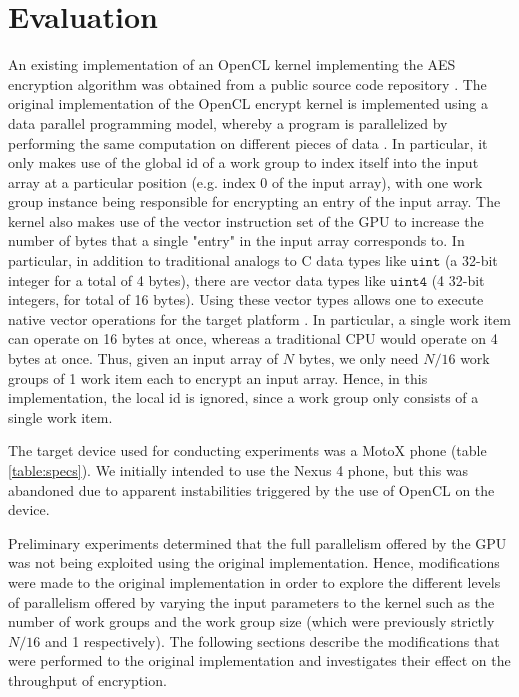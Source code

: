 \documentclass[conference,10pt]{IEEEtran}
\begin{document}

\section{Evaluation}

An existing implementation of an OpenCL kernel implementing the AES encryption algorithm was obtained from 
a public source code repository \cite{opencl_impl}.  The original implementation of the OpenCL encrypt 
kernel is implemented using a data parallel programming model, whereby a program is parallelized by 
performing the same computation on different pieces of data \cite{opencl_guide}.  In particular, it only 
makes use of the global id of a work group to index itself into the input array at a particular position 
(e.g. index 0 of the input array), with one work group instance being responsible for encrypting an entry 
of the input array. The kernel also makes use of the vector instruction set of the GPU to increase the 
number of bytes that a single "entry" in the input array corresponds to. In particular, in addition to 
traditional analogs to C data types like $\mathtt{uint}$ (a 32-bit integer for a total of 4 bytes), there 
are vector data types like $\mathtt{uint4}$ (4 32-bit integers, for total of 16 bytes). Using these vector 
types allows one to execute native vector operations for the target platform \cite{opencl_guide}.  In 
particular, a single work item can operate on 16 bytes at once, whereas a traditional CPU would operate on 
4 bytes at once. Thus, given an input array of $N$ bytes, we only need $N/16$ work groups of 1 work item 
each to encrypt an input array. Hence, in this implementation, the local id is ignored, since a work group 
only consists of a single work item.

The target device used for conducting experiments was a MotoX phone \cite{specs} (table \ref{table:specs}).  
We initially intended to use the Nexus 4 phone, but this was abandoned due to apparent instabilities 
triggered by the use of OpenCL on the device. 

Preliminary experiments determined that the full parallelism offered by the GPU was not being exploited 
using the original implementation.  Hence, modifications were made to the original implementation in order 
to explore the different levels of parallelism offered by varying the input parameters to the kernel such 
as the number of work groups and the work group size (which were previously strictly $N/16$ and 1 
respectively).  The following sections describe the modifications that were performed to the original 
implementation and investigates their effect on the throughput of encryption.
\end{document}
